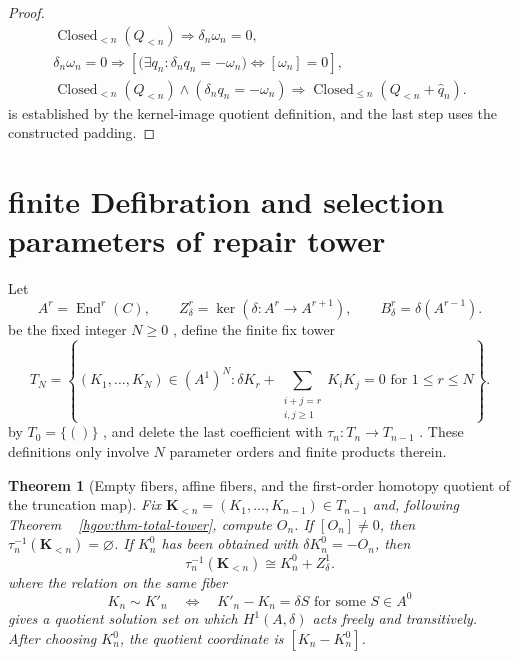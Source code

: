 \documentclass[12pt,a4paper,openany,notitlepage]{report}
\theoremstyle{plain}
\newtheorem{theorem}{Theorem}[chapter]
\theoremstyle{definition}
\theoremstyle{remark}
\def\mathcal#1{#1}\def\mathsf#1{#1}\def\mathbb#1{#1}%
\begin{document}
\begin{CJK*}
\begin{proof}
\[ \begin{gathered}
 \operatorname{Closed}_{<n}(Q_{<n})
 \Longrightarrow\delta_n\omega_n=0,\\
 \delta_n\omega_n=0
 \Longrightarrow
 \left[
 \bigl(\exists q_n:\delta_nq_n=-\omega_n\bigr)
 \Longleftrightarrow[\omega_n]=0
 \right],\\
 \operatorname{Closed}_{<n}(Q_{<n})
 \wedge(\delta_nq_n=-\omega_n)
 \Longrightarrow
 \operatorname{Closed}_{\le n}(Q_{<n}+\widehat q_n).
 \end{gathered}
\] is established by the kernel-image quotient definition, and the last step uses the constructed padding.\end{proof}


\section { finite Defibration and selection parameters of repair tower }\label{exp:hom:tower-fibres}


Let \[
 \mathcal A^r=\operatorname{End}^r(C),\qquad
 Z^r_\delta=\ker(\delta:\mathcal A^r\to\mathcal A^{r+1}),\qquad
 B^r_\delta=\delta(\mathcal A^{r-1}).
\] be the fixed integer $N\ge0$ , define the finite fix tower \[
 \mathcal T_N=
 \left\{(K_1,\ldots,K_N)\in(\mathcal A^1)^N:
 \delta K_r+\sum_{\substack{i+j=r\\i,j\ge1}}K_iK_j=0
 \text{ for }1\le r\le N\right\}.
\] by $\mathcal T_0=\{()\}$ , and delete the last coefficient with $\tau_n:\mathcal T_n\to\mathcal T_{n-1}$ . These definitions only involve $N$ parameter orders and finite products therein.

\begin{theorem} [Empty fibers, affine fibers, and the first-order homotopy quotient of the truncation map]
\label{exp:hom:tower-fibre}
Fix $\mathbf K_{<n}=(K_1,\ldots,K_{n-1})\in\mathcal T_{n-1}$ and, following Theorem ~ \ref{hgov:thm-total-tower}, compute $O_n$. If $[O_n]\ne0$, then
$\tau_n^{-1}(\mathbf K_{<n})=\varnothing$.
If $K_n^0$ has been obtained with $\delta K_n^0=-O_n$, then
\[
 \tau_n^{-1}(\mathbf K_{<n})
 \cong K_n^0+Z^1_\delta.
\]
where the relation on the same fiber
\[
 K_n\sim K'_n
 \quad\Longleftrightarrow\quad
 K'_n-K_n=\delta S
 \text{ for some }S\in\mathcal A^0
\]
gives a quotient solution set on which $H^1(\mathcal A,\delta)$ acts freely and transitively. After choosing $K_n^0$, the quotient coordinate is $[K_n-K_n^0]$.


\end{theorem}
\end{CJK*}
\end{document}
